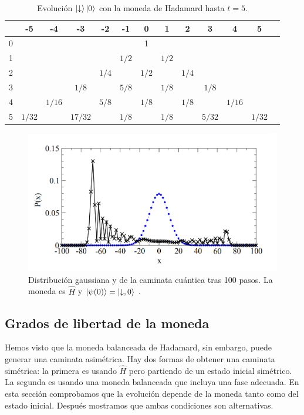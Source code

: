 \begin{table}[h]
    \centering
    \begin{tabular}{|c||c|c|c|c|c|c|c|c|c|c|c|c|}
        \hline
         &-5&-4&-3&-2&-1&0&1&2&3&4&5\\\hline\hline
        0&&&&&&1&&&&& \\ \hline
        1&&&&&$1/2$&&$1/2$&&&& \\\hline
        2&&&&$1/4$&&$1/2$&&$1/4$&&& \\ \hline
        3&&&$1/8$&&$5/8$&&$1/8$&&$1/8$&& \\ \hline
        4&&$1/16$&&$5/8$&&$1/8$&&$1/8$&&$1/16$& \\\hline
        5&$1/32$&&$17/32$&&$1/8$&&$1/8$&&$5/32$&&$1/32$ \\
    \hline
    \end{tabular}
    \medskip
    \caption{Evolución $\ket{\downarrow}\ket{0}$ con la moneda de Hadamard hasta $t=5$.}
    \label{TablaCuantica}
\end{table}

\begin{figure}[ht]
\centering
\includegraphics[width=1\textwidth]{Kap3/comparisonQW.png}
\caption{Distribución gaussiana y de la caminata cuántica tras 100 pasos. La moneda es $\hat{H}$ y $\ket{\psi(0)}=\ket{\downarrow,0}$ \cite{kendon2007decoherence}.}
\label{gr:LineaHadamard100}
\end{figure}

\subsection{Grados de libertad de la moneda}\label{sec:Moneda}
Hemos visto que la moneda balanceada de Hadamard, sin embargo, puede generar una caminata asimétrica. Hay dos formas de obtener una caminata simétrica: la primera es usando $\hat{H}$ pero partiendo de un estado inicial simétrico. La segunda es usando una moneda balanceada que incluya una fase adecuada. En esta sección comprobamos que la evolución depende de la moneda tanto como del estado inicial. Después mostramos que ambas condiciones son alternativas.\\

